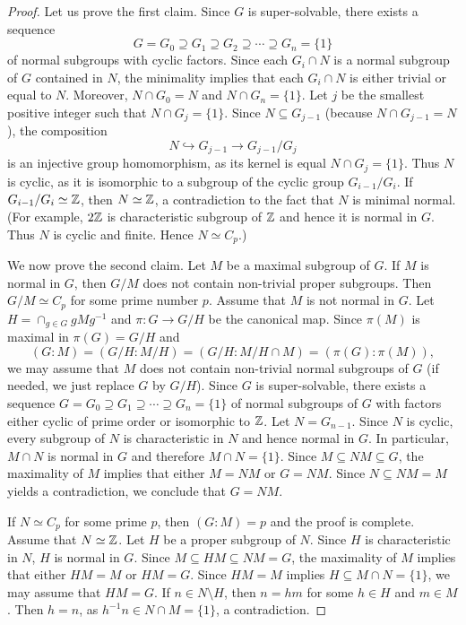 \begin{proof}
Let us prove the first claim. Since $G$ is super-solvable, there exists a sequence 
\[
G=G_0\supseteq G_1\supseteq
G_2\supseteq\cdots\supseteq G_n=\{1\}
\]
of normal subgroups with cyclic factors. Since 
each $G_i\cap N$ is a normal subgroup of $G$ contained in $N$, 
the minimality implies that 
each $G_i\cap N$ is either trivial or equal to $N$. Moreover, $N\cap G_0=N$ and $N\cap
G_n=\{1\}$. Let $j$ be the smallest positive integer such that $N\cap G_j=\{1\}$. 
Since $N\subseteq G_{j-1}$ (because $N\cap G_{j-1}=N$), the composition 
	\[
	N\hookrightarrow G_{j-1}\to G_{j-1}/G_j
	\]
is an injective group homomorphism, as its kernel is equal $N\cap G_{j}=\{1\}$. 
Thus $N$ is cyclic, as it is isomorphic to a subgroup of the cyclic group $G_{i-1}/G_i$. 
If $G_{i-1}/G_i\simeq\mathbb{Z}$, then $N\simeq\mathbb{Z}$, a contradiction to the fact that $N$ is minimal normal. (For example, 
$2\mathbb{Z}$ is characteristic subgroup of $\mathbb{Z}$ and hence it is normal in $G$. Thus $N$ is cyclic and finite. Hence $N\simeq C_p$.)

We now prove the second claim. Let $M$ be a maximal subgroup of $G$. If $M$ is normal in $G$, 
then $G/M$ does not contain non-trivial proper subgroups. Then 
$G/M\simeq C_p$ for some prime number $p$. Assume that $M$ is not normal in $G$. 
Let $H=\cap_{g\in G}gMg^{-1}$ and $\pi\colon G\to G/H$ be the canonical map.  
Since $\pi(M)$ is maximal in 
	$\pi(G)=G/H$ and 
	\[
		(G:M)=(G/H:M/H)=(G/H:M/H\cap M)=(\pi(G):\pi(M)),
	\]
we may assume that $M$ does not contain non-trivial normal subgroups of $G$ (if needed, 
we just replace $G$ by $G/H$). Since $G$ is super-solvable, there exists a sequence 
$G=G_0\supseteq G_1\supseteq\cdots\supseteq G_n=\{1\}$ of normal subgroups of $G$ 
with factors either cyclic of prime order or isomorphic to $\mathbb{Z}$. Let 
$N=G_{n-1}$. Since $N$ is cyclic, every subgroup of $N$ is characteristic 
in $N$ and hence normal in $G$. In particular, $M\cap N$ is normal in 
$G$ and therefore $M\cap N=\{1\}$. Since $M\subseteq
NM\subseteq G$, the maximality of $M$ implies that either $M=NM$ or $G=NM$.
Since $N\subseteq NM=M$ yields a contradiction, we conclude that $G=NM$.

If $N\simeq C_p$ for some prime $p$, then $(G:M)=p$ and the proof is complete. 
Assume that $N\simeq\mathbb{Z}$. Let $H$ be a proper subgroup of $N$. Since 
$H$ is characteristic in $N$, $H$ is normal in $G$. Since 
$M\subseteq HM\subseteq NM=G$, the maximality of $M$ implies that either $HM=M$ or 
$HM=G$. Since $HM=M$ implies $H\subseteq M\cap N=\{1\}$,
we may assume that $HM=G$. If $n\in N\setminus H$, then $n=hm$ for some 
$h\in H$ and $m\in M$. Then $h=n$, as $h^{-1}n\in N\cap M=\{1\}$, a contradiction. 


\end{proof}
